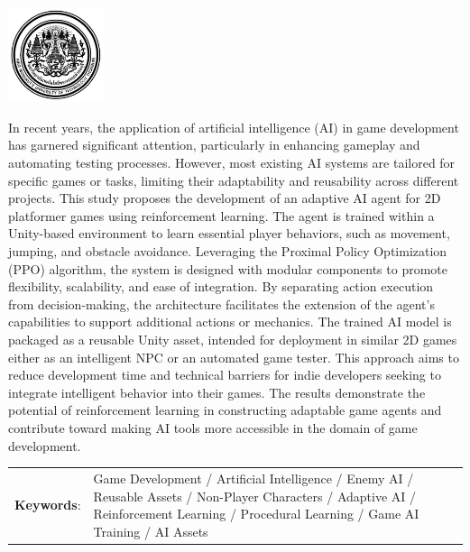 \documentclass[12pt,oneside,openright,a4paper]{cpe-english-project}
\begin{document}
\pdfstringdefDisableCommands{%
\let\MakeUppercase\relax
}
\begin{center}
  \includegraphics[width=2.8cm]{logo02.jpg}
\end{center}
\vspace*{-1cm}

\maketitlepage
\makesignaturepage 

\abstract

In recent years, the application of artificial intelligence (AI) in game development has garnered significant attention, particularly in enhancing gameplay and automating testing processes. However, most existing AI systems are tailored for specific games or tasks, limiting their adaptability and reusability across different projects. This study proposes the development of an adaptive AI agent for 2D platformer games using reinforcement learning. The agent is trained within a Unity-based environment to learn essential player behaviors, such as movement, jumping, and obstacle avoidance. Leveraging the Proximal Policy Optimization (PPO) algorithm, the system is designed with modular components to promote flexibility, scalability, and ease of integration. By separating action execution from decision-making, the architecture facilitates the extension of the agent’s capabilities to support additional actions or mechanics. The trained AI model is packaged as a reusable Unity asset, intended for deployment in similar 2D games either as an intelligent NPC or an automated game tester. This approach aims to reduce development time and technical barriers for indie developers seeking to integrate intelligent behavior into their games. The results demonstrate the potential of reinforcement learning in constructing adaptable game agents and contribute toward making AI tools more accessible in the domain of game development.

\begin{flushleft}
\begin{tabular*}{\textwidth}{@{}lp{}}
\textbf{Keywords}: & Game Development / Artificial Intelligence / Enemy AI / Reusable Assets / Non-Player Characters / Adaptive AI / Reinforcement Learning / Procedural Learning / Game AI Training / AI Assets
\end{tabular*}
\end{flushleft}
\endabstract
\end{document}
